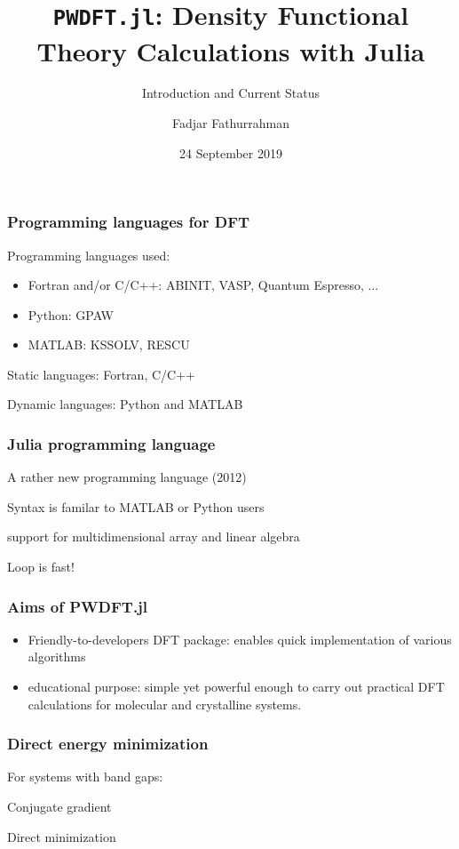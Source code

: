\documentclass[english,9pt]{beamer}
\begin{document}
\title{\texttt{PWDFT.jl}: Density Functional Theory Calculations with Julia}
\subtitle{Introduction and Current Status}
\author{Fadjar Fathurrahman}
\date{24 September 2019}


\frame{\titlepage}



\begin{frame}
\frametitle{Programming languages for DFT}
    
Programming languages used:
\begin{itemize}
\item Fortran and/or C/C++: ABINIT, VASP, Quantum Espresso, ...
\item Python: GPAW
\item MATLAB: KSSOLV, RESCU
\end{itemize}
    
Static languages: Fortran, C/C++

Dynamic languages: Python and MATLAB

\end{frame}



\begin{frame}
\frametitle{Julia programming language}

A rather new programming language (2012)

Syntax is familar to MATLAB or Python users

support for multidimensional array and linear algebra

Loop is fast!

\end{frame}


\begin{frame}
\frametitle{Aims of PWDFT.jl}

\begin{itemize}
\item Friendly-to-developers DFT package: enables quick implementation of various algorithms
\item educational purpose: simple yet powerful enough to carry out practical DFT calculations
for molecular and crystalline systems.
\end{itemize}

\end{frame}







\begin{frame}
\frametitle{Direct energy minimization}

For systems with band gaps:

Conjugate gradient

Direct minimization

\end{frame}
\end{document}
